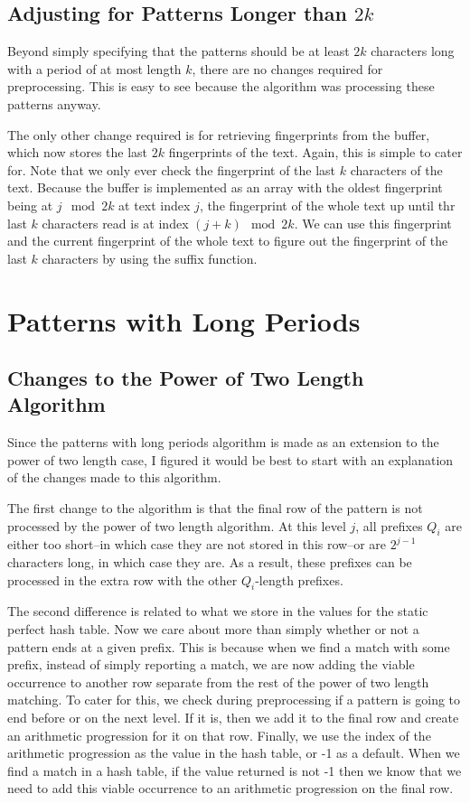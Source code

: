 \documentclass[ %
                    author={Dominic Joseph Moylett},
                    degree={MEng},
                     title={Dictionary Matching with Fingerprints},
                  subtitle={An Empirical Analysis},
                      type={Research},
                      year={2014} ]{dissertation}
\begin{document}
\subsection{Adjusting for Patterns Longer than $2k$}

Beyond simply specifying that the patterns should be at least $2k$ characters long with a period of at most length $k$, there are no changes required for preprocessing. This is easy to see because the algorithm was processing these patterns anyway.

The only other change required is for retrieving fingerprints from the buffer, which now stores the last $2k$ fingerprints of the text. Again, this is simple to cater for. Note that we only ever check the fingerprint of the last $k$ characters of the text. Because the buffer is implemented as an array with the oldest fingerprint being at $j \mod 2k$ at text index $j$, the fingerprint of the whole text up until thr last $k$ characters read is at index $(j + k) \mod 2k$. We can use this fingerprint and the current fingerprint of the whole text to figure out the fingerprint of the last $k$ characters by using the suffix function.

\section{Patterns with Long Periods}
\label{sec:impl-long}

\subsection{Changes to the Power of Two Length Algorithm}

Since the patterns with long periods algorithm is made as an extension to the power of two length case, I figured it would be best to start with an explanation of the changes made to this algorithm.

The first change to the algorithm is that the final row of the pattern is not processed by the power of two length algorithm. At this level $j$, all prefixes $Q_i$ are either too short--in which case they are not stored in this row--or are $2^{j - 1}$ characters long, in which case they are. As a result, these prefixes can be processed in the extra row with the other $Q_i$-length prefixes.

The second difference is related to what we store in the values for the static perfect hash table. Now we care about more than simply whether or not a pattern ends at a given prefix. This is because when we find a match with some prefix, instead of simply reporting a match, we are now adding the viable occurrence to another row separate from the rest of the power of two length matching. To cater for this, we check during preprocessing if a pattern is going to end before or on the next level. If it is, then we add it to the final row and create an arithmetic progression for it on that row. Finally, we use the index of the arithmetic progression as the value in the hash table, or -1 as a default. When we find a match in a hash table, if the value returned is not -1 then we know that we need to add this viable occurrence to an arithmetic progression on the final row.
\end{document}
